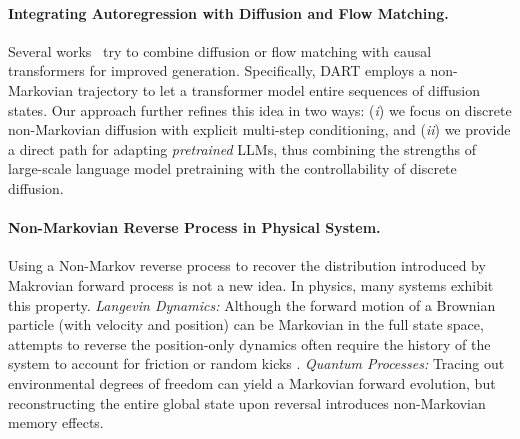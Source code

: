 \paragraph{Integrating Autoregression with Diffusion and Flow Matching.}
Several works~\citep{DART, he2024calmflowvolterraflowmatching} try to combine diffusion or flow matching with causal transformers for improved generation. Specifically, DART \citep{DART} employs a non-Markovian trajectory to let a transformer model entire sequences of diffusion states. Our approach {further refines} this idea in two ways: (\textit{i}) we focus on discrete non-Markovian diffusion with explicit multi-step conditioning, and (\textit{ii}) we provide a direct path for adapting \textit{pretrained} LLMs, thus combining the strengths of large-scale language model pretraining with the controllability of discrete diffusion.

\paragraph{Non-Markovian Reverse Process in Physical System.}
Using a Non-Markov reverse process to recover the distribution introduced by Makrovian forward process is not a new idea. In physics, many systems exhibit this property. \textit{Langevin Dynamics:} Although the forward motion of a Brownian particle (with velocity and position) can be Markovian in the full state space, attempts to reverse the position-only dynamics often require the history of the system to account for friction or random kicks \citep{gardinerstochastic, van1992stochastic}. \textit{Quantum Processes:} Tracing out environmental degrees of freedom can yield a Markovian forward evolution, but reconstructing the entire global state upon reversal introduces non-Markovian memory effects.




